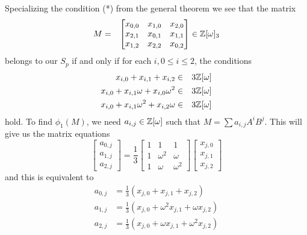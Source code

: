 \documentclass[11pt]{report}
\begin{document}
Specializing the condition (*) from the general theorem we see 
that the matrix
\begin{align*}
M&=&\begin{bmatrix}
x_{0,0}&x_{1,0}&x_{2,0}\\
x_{2,1}&x_{0,1}&x_{1,1}\\
x_{1,2}&x_{2,2}&x_{0,2}
\end{bmatrix} \in  \mathbb{Z}[\omega]_3
\end{align*}
belongs to our $S_p$ if and only if for each $i, 0\leq i \leq 2$,
the conditions
\begin{align*}
x_{i,0} + x_{i,1} + x_{i,2} &\in & 3 \mathbb{Z}[\omega] \\
x_{i,0} + x_{i,1}\omega + x_{i,0}\omega^2 &\in & 3 \mathbb{Z}[\omega] \\
x_{i,0} + x_{i,1}\omega^2 + x_{i,2}\omega &\in & 3 \mathbb{Z}[\omega]
\end{align*}
hold. To find $\phi_1(M)$, we need $a_{i,j} \in  \mathbb{Z}[\omega]$ 
such that $M=\sum a_{i,j}A^iB^j$. This will give us the matrix
equations
\begin{equation*}
\begin{bmatrix}
a_{0,j}\\
a_{1,j}\\
a_{2,j}
\end{bmatrix} =\frac{1}{3}
\begin{bmatrix}
1&1&1\\
1&\omega^2&\omega\\
1&\omega&\omega^2
\end{bmatrix}
\begin{bmatrix}
x_{j,0}\\
x_{j,1}\\
x_{j,2}
\end{bmatrix}
\end{equation*}
and this is equivalent to
\begin{equation}\label{eqn:grp27}
\begin{split}
a_{0,j} &= \frac{1}{3}(x_{j,0}+x_{j,1}+x_{j,2})\\
a_{1,j} &= \frac{1}{3}(x_{j,0}+\omega^2 x_{j,1}+ \omega x_{j,2})\\
a_{2,j} &= \frac{1}{3}(x_{j,0}+\omega x_{j,1}+ \omega^2 x_{j,2})
\end{split}
\end{equation}
\end{document}
